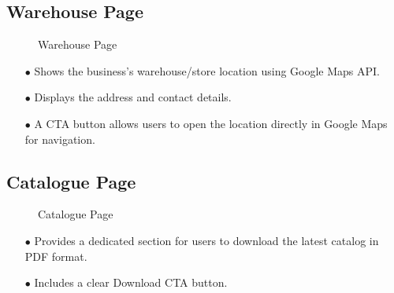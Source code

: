 \documentclass[oneside,a4paper,12pt,explicit]{book}
\begin{document}
\subsection{Warehouse Page}
\begin{figure}[H]
    \centering
    \caption{Warehouse Page}
\end{figure}
\begin{enumerate}
    \item[$\bullet$] Shows the business’s warehouse/store location using Google Maps API.
    \item[$\bullet$] Displays the address and contact details.
    \item[$\bullet$] A CTA button allows users to open the location directly in Google Maps for navigation.
\end{enumerate}

\subsection{Catalogue Page}
\begin{figure}[H]
    \centering
    \caption{Catalogue Page}
\end{figure}
\begin{enumerate}
    \item[$\bullet$] Provides a dedicated section for users to download the latest catalog in PDF format.
    \item[$\bullet$] Includes a clear Download CTA button.
\end{enumerate}
\end{document}
